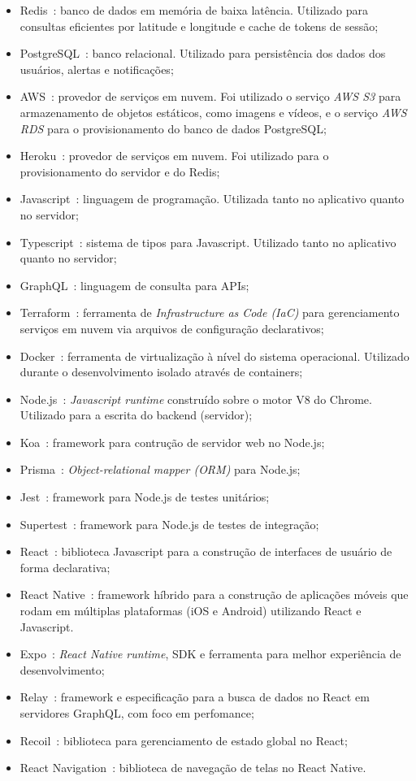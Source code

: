 \begin{itemize}
	\item Redis~\cite{redis}: banco de dados em memória de baixa latência. Utilizado para consultas eficientes por latitude e longitude e cache de tokens de sessão;
	\item PostgreSQL~\cite{postgresql}: banco relacional. Utilizado para persistência dos dados dos usuários, alertas e notificações;
	\item AWS~\cite{aws}: provedor de serviços em nuvem. Foi utilizado o serviço \emph{AWS S3} para armazenamento de objetos estáticos, como imagens e vídeos, e o serviço \emph{AWS RDS} para o provisionamento do banco de dados PostgreSQL;
	\item Heroku~\cite{heroku}: provedor de serviços em nuvem. Foi utilizado para o provisionamento do servidor e do Redis;
	\item Javascript~\cite{javascript}: linguagem de programação. Utilizada tanto no aplicativo quanto no servidor;
	\item Typescript~\cite{typescript}: sistema de tipos para Javascript. Utilizado tanto  no aplicativo quanto no servidor;
	\item GraphQL~\cite{graphql}: linguagem de consulta para APIs;
	\item Terraform~\cite{terraform}: ferramenta de \emph{Infrastructure as Code (IaC)} para gerenciamento serviços em nuvem via arquivos de configuração declarativos;
	\item Docker~\cite{docker}: ferramenta de virtualização à nível do sistema operacional. Utilizado durante o desenvolvimento isolado através de containers;
	\item Node.js~\cite{node}: \emph{Javascript runtime} construído sobre o motor V8 do Chrome. Utilizado para a escrita do backend (servidor);
	\item Koa~\cite{koa}: framework para contrução de servidor web no Node.js;
	\item Prisma~\cite{prisma}: \emph{Object-relational mapper (ORM)} para Node.js;
	\item Jest~\cite{jest}: framework para Node.js de testes unitários;
	\item Supertest~\cite{supertest}: framework para Node.js de testes de integração;
	\item React~\cite{react}: biblioteca Javascript para a construção de interfaces de usuário de forma declarativa;
	\item React Native~\cite{react-native}: framework híbrido para a construção de aplicações móveis que rodam em múltiplas plataformas (iOS e Android) utilizando React e Javascript. 	
	\item Expo~\cite{expo}: \emph{React Native runtime}, SDK e ferramenta para melhor experiência de desenvolvimento;
	\item Relay~\cite{relay}: framework e especificação para a busca de dados no React em servidores GraphQL, com foco em perfomance;
	\item Recoil~\cite{recoil}: biblioteca para gerenciamento de estado global no React;
	\item React Navigation~\cite{react-navigation}: biblioteca de navegação de telas no React Native.
\end{itemize}

